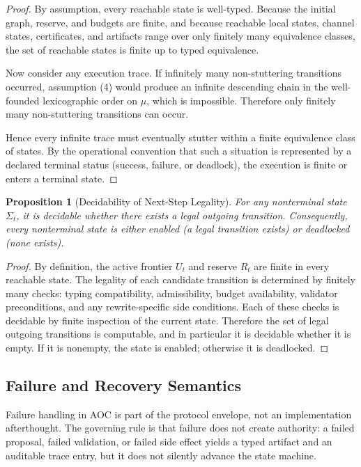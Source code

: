 \documentclass[11pt]{article}
\newtheorem{proposition}{Proposition}[section]
\theoremstyle{remark}
\newcommand{\AOC}{\textup{\textsc{AOC}}}
\begin{document}
\begin{proof}
By assumption, every reachable state is well-typed. Because the initial graph, reserve, and budgets are finite, and because reachable local states, channel states, certificates, and artifacts range over only finitely many equivalence classes, the set of reachable states is finite up to typed equivalence.

Now consider any execution trace. If infinitely many non-stuttering transitions occurred, assumption (4) would produce an infinite descending chain in the well-founded lexicographic order on \(\mu\), which is impossible. Therefore only finitely many non-stuttering transitions can occur.

Hence every infinite trace must eventually stutter within a finite equivalence class of states. By the operational convention that such a situation is represented by a declared terminal status (success, failure, or deadlock), the execution is finite or enters a terminal state.
\end{proof}

\begin{proposition}[Decidability of Next-Step Legality]\label{prop:decidable-next-step}
For any nonterminal state \(\Sigma_t\), it is decidable whether there exists a legal outgoing transition. Consequently, every nonterminal state is either enabled (a legal transition exists) or deadlocked (none exists).
\end{proposition}

\begin{proof}
By definition, the active frontier \(U_t\) and reserve \(R_t\) are finite in every reachable state. The legality of each candidate transition is determined by finitely many checks: typing compatibility, admissibility, budget availability, validator preconditions, and any rewrite-specific side conditions. Each of these checks is decidable by finite inspection of the current state. Therefore the set of legal outgoing transitions is computable, and in particular it is decidable whether it is empty. If it is nonempty, the state is enabled; otherwise it is deadlocked.
\end{proof}

\subsection{Failure and Recovery Semantics}\label{sec:failure-recovery}

Failure handling in \AOC{} is part of the protocol envelope, not an implementation afterthought. The governing rule is that failure does not create authority: a failed proposal, failed validation, or failed side effect yields a typed artifact and an auditable trace entry, but it does not silently advance the state machine.
\end{document}

